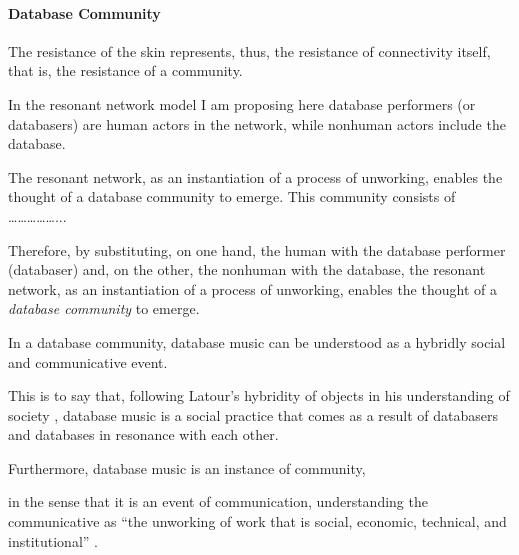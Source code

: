 \paragraph{Database Community}


The resistance of the skin represents, thus, the resistance of connectivity itself, that is, the resistance of a community. 

{
	

	In the resonant network model I am proposing here database performers (or databasers) are human actors in the network, while nonhuman actors include the database. 

% 


	The resonant network, as an instantiation of a process of unworking, enables the thought of a database community to emerge. This community consists of ……………...
}

Therefore, by substituting, on one hand, the human with the database performer (databaser) and, on the other, the nonhuman with the database, the resonant network, as an instantiation of a process of unworking, enables the thought of a \textit{database community} to emerge. 

In a database community, database music can be understood as a hybridly social and communicative event. 

This is to say that, following Latour's hybridity of objects in his understanding of society \parencite[2]{Lat90:On}, database music is a social practice that comes as a result of databasers and databases in resonance with each other. 


Furthermore, database music is an instance of community, 


in the sense that it is an event of communication, understanding the communicative as ``the unworking of work that is social, economic, technical, and institutional'' \parencite[31]{Nan91:The}. 

